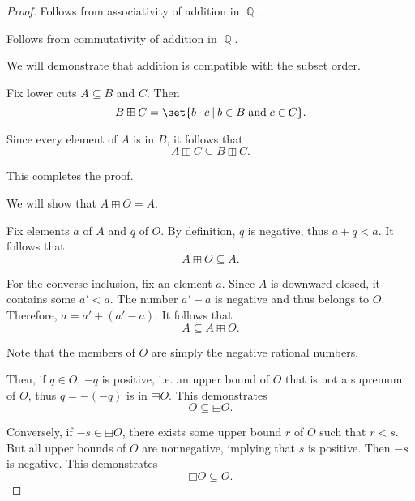\begin{proof}
   Follows from associativity of addition in \( \BbbQ \).

   Follows from commutativity of addition in \( \BbbQ \).

   We will demonstrate that addition is compatible with the subset order.

  Fix lower cuts \( A \subseteq B \) and \( C \). Then
  \begin{equation*}
    B \boxplus C = \set{ b \cdot c \given b \in B \T{and} c \in C }.
  \end{equation*}

  Since every element of \( A \) is in \( B \), it follows that
  \begin{equation*}
    A \boxplus C \subseteq B \boxplus C.
  \end{equation*}

  This completes the proof.

   We will show that \( A \boxplus O = A \).

  Fix elements \( a \) of \( A \) and \( q \) of \( O \). By definition, \( q \) is negative, thus \( a + q < a \). It follows that
  \begin{equation*}
    A \boxplus O \subseteq A.
  \end{equation*}

  For the converse inclusion, fix an element \( a \). Since \( A \) is downward closed, it contains some \( a' < a \). The number \( a' - a \) is negative and thus belongs to \( O \). Therefore, \( a = a' + (a' - a) \). It follows that
  \begin{equation*}
    A \subseteq A \boxplus O.
  \end{equation*}

   Note that the members of \( O \) are simply the negative rational numbers.

  Then, if \( q \in O \), \( -q \) is positive, i.e. an upper bound of \( O \) that is not a supremum of \( O \), thus \( q = -(-q) \) is in \( \boxminus O \). This demonstrates
  \begin{equation*}
    O \subseteq \boxminus O.
  \end{equation*}

  Conversely, if \( -s \in \boxminus O \), there exists some upper bound \( r \) of \( O \) such that \( r < s \). But all upper bounds of \( O \) are nonnegative, implying that \( s \) is positive. Then \( -s \) is negative. This demonstrates
  \begin{equation*}
    \boxminus O \subseteq O.
  \end{equation*}


\end{proof}
